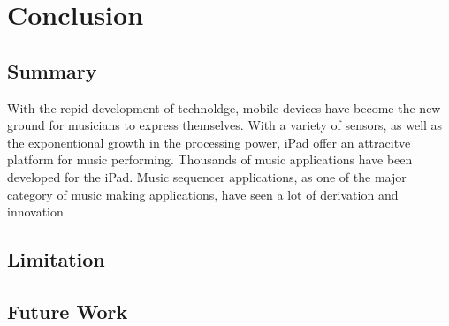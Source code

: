 \chapter{Conclusion}
\label{ch: chapter 5}
\section{Summary}

With the repid development of technoldge, mobile devices have become the new ground for musicians to express themselves. With a variety of sensors, as well as the exponentional growth in the processing power, iPad offer an attracitve platform for music performing. Thousands of music applications have been developed for the iPad. Music sequencer applications, as one of the major category of music making applications, have seen a lot of derivation and innovation

\section{Limitation}

\section{Future Work}
